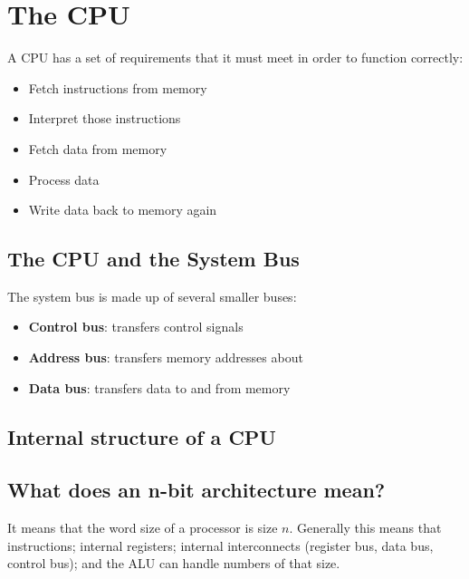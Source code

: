 \section{The CPU}\label{sec:the_cpu}

A CPU has a set of requirements that it must meet in order to function correctly:
\begin{itemize}
	\item Fetch instructions from memory
	\item Interpret those instructions
	\item Fetch data from memory
	\item Process data
	\item Write data back to memory again
\end{itemize}

\subsection{The CPU and the System Bus}\label{sub:the_cpu_and_the_system_bus}

The system bus is made up of several smaller buses:
\begin{itemize}
	\item \textbf{Control bus}: transfers control signals
	\item \textbf{Address bus}: transfers memory addresses about
	\item \textbf{Data bus}: transfers data to and from memory
\end{itemize}

\subsection{Internal structure of a CPU}\label{sub:internal_structure_of_a_cpu}


\subsection{What does an n-bit architecture mean?}\label{sub:what_does_an_n_bit_architecture_mean_}

It means that the word size of a processor is size \(n\).
Generally this means that instructions; internal registers; internal interconnects (register bus, data bus, control bus); and the ALU can handle numbers of that size.

